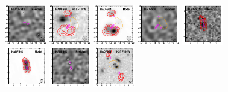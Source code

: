 \documentclass[iop]{emulateapj}
\begin{document}
\begin{figure}[!tbp]
\begin{centering}
\includegraphics[width=0.162\textwidth]{HECDFS13_residual_bestfit.pdf}
\includegraphics[width=0.162\textwidth]{HADFS04_optical_bestfit.pdf}
\includegraphics[width=0.162\textwidth]{HADFS04_model_bestfit.pdf}
\includegraphics[width=0.162\textwidth]{HADFS04_residual_bestfit.pdf}
\includegraphics[width=0.162\textwidth]{HADFS02_optical_bestfit.pdf}
\includegraphics[width=0.162\textwidth]{HADFS02_model_bestfit.pdf}
\includegraphics[width=0.162\textwidth]{HADFS02_residual_bestfit.pdf}
\includegraphics[width=0.162\textwidth]{HADFS11_optical_bestfit.pdf}

\end{centering}
\end{figure}
\end{document}

